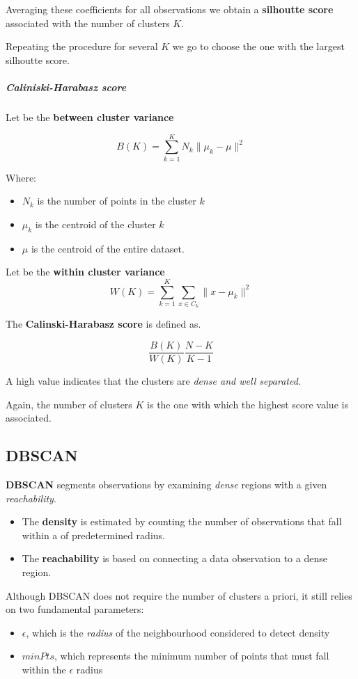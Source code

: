 Averaging these coefficients for all observations we obtain a \textbf{silhoutte score} associated with the number of clusters $K$. 

Repeating the procedure for several $K$ we go to choose the one with the largest silhoutte score.
\subparagraph*{Caliniski-Harabasz score}

Let be the \textbf{between cluster variance}

\[
    B(K)=\sum_{k=1}^KN_k\|\mu_k-\mu\|^2
\]

Where:
\begin{itemize}
    \item $N_k$ is the number of points in the cluster $k$
    \item $\mu_k$ is the centroid of the cluster $k$
    \item $\mu$ is the centroid of the entire dataset.
\end{itemize}

Let be the \textbf{within cluster variance}
\[
    W(K)=\sum_{k=1}^K\sum_{x\in C_k}\|x-\mu_k\|^2
\]

The \textbf{Calinski-Harabasz score} is defined as.

\[
    \frac{B(K)}{W(K)}\frac{N-K}{K-1}
\]

A high value indicates that the clusters are \textit{dense and well separated}.

Again, the number of clusters $K$ is the one with which the highest score value is associated.

\subsection{DBSCAN}
\textbf{DBSCAN} segments observations by examining \textit{dense} regions with a given \textit{reachability}.

\begin{itemize}
    \item The \textbf{density} is estimated by counting the number of observations that fall within a of predetermined radius.
    \item The \textbf{reachability} is based on connecting a data observation to a dense region. 
\end{itemize}

Although DBSCAN does not require the number of clusters a priori, it still relies on two fundamental parameters:
\begin{itemize}
    \item $\epsilon$, which is the \textit{radius} of the neighbourhood considered to detect density
    \item $minPts$, which represents the minimum number of points that must fall within the $\epsilon$ radius
\end{itemize}

